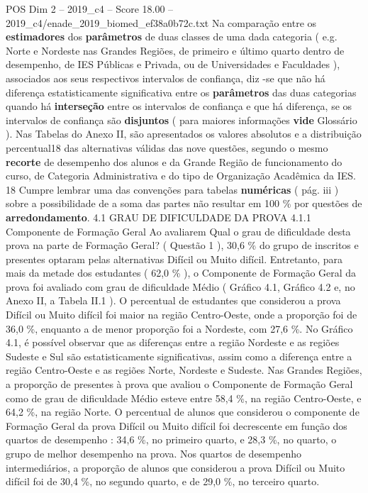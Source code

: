 \begin{textsample}{POS Dim 2 – 2019\_c4 – Score 18.00 – 2019\_c4/enade\_2019\_biomed\_ef38a0b72c.txt}
Na comparação entre os \textbf{estimadores} dos \textbf{parâmetros} de duas classes de uma dada categoria ( e.g.
Norte e Nordeste nas Grandes Regiões, de primeiro e último quarto dentro de desempenho, de IES Públicas e Privada, ou de Universidades e Faculdades ), associados aos seus respectivos intervalos de confiança, diz -se que não há diferença estatisticamente significativa entre os \textbf{parâmetros} das duas categorias quando há \textbf{interseção} entre os intervalos de confiança e que há diferença, se os intervalos de confiança são \textbf{disjuntos} ( para maiores informações \textbf{vide} Glossário ).
Nas Tabelas do Anexo II, são apresentados os valores absolutos e a distribuição percentual18 das alternativas válidas das nove questões, segundo o mesmo \textbf{recorte} de desempenho dos alunos e da Grande Região de funcionamento do curso, de Categoria Administrativa e do tipo de Organização Acadêmica da IES. 18 Cumpre lembrar uma das convenções para tabelas \textbf{numéricas} ( pág. iii ) sobre a possibilidade de a soma das partes não resultar em 100 \% por questões de \textbf{arredondamento}. 4.1 GRAU DE DIFICULDADE DA PROVA 4.1.1 Componente de Formação Geral Ao avaliarem Qual o grau de dificuldade desta prova na parte de Formação Geral? ( Questão 1 ), 30,6 \% do grupo de inscritos e presentes optaram pelas alternativas Difícil ou Muito difícil.
Entretanto, para mais da metade dos estudantes ( 62,0 \% ), o Componente de Formação Geral da prova foi avaliado com grau de dificuldade Médio ( Gráfico 4.1, Gráfico 4.2 e, no Anexo II, a Tabela II.1 ).
O percentual de estudantes que considerou a prova Difícil ou Muito difícil foi maior na região Centro-Oeste, onde a proporção foi de 36,0 \%, enquanto a de menor proporção foi a Nordeste, com 27,6 \%.
No Gráfico 4.1, é possível observar que as diferenças entre a região Nordeste e as regiões Sudeste e Sul são estatisticamente significativas, assim como a diferença entre a região Centro-Oeste e as regiões Norte, Nordeste e Sudeste.
Nas Grandes Regiões, a proporção de presentes à prova que avaliou o Componente de Formação Geral como de grau de dificuldade Médio esteve entre 58,4 \%, na região Centro-Oeste, e 64,2 \%, na região Norte.
O percentual de alunos que considerou o componente de Formação Geral da prova Difícil ou Muito difícil foi decrescente em função dos quartos de desempenho : 34,6 \%, no primeiro quarto, e 28,3 \%, no quarto, o grupo de melhor desempenho na prova.
Nos quartos de desempenho intermediários, a proporção de alunos que considerou a prova Difícil ou Muito difícil foi de 30,4 \%, no segundo quarto, e de 29,0 \%, no terceiro quarto.

\end{textsample}
